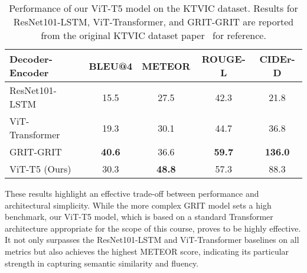 \begin{table}[H]
  \centering
  \renewcommand{\arraystretch}{1.5}
  \normalsize
  \label{tab:ktvic_comparison}
  \begin{tabular}{lcccc}
    \hline
    \textbf{Decoder-Encoder} & \textbf{BLEU@4} &
    \textbf{METEOR} & \textbf{ROUGE-L} & \textbf{CIDEr-D} \\
    \hline
    ResNet101-LSTM & 15.5 & 27.5 & 42.3 & 21.8   \\
    ViT-Transformer & 19.3 & 30.1 & 44.7 & 36.8    \\
    GRIT-GRIT & \textbf{40.6} & 36.6 & \textbf{59.7} & \textbf{136.0}    \\
    \hline
    ViT-T5 (Ours) & 30.3 & \textbf{48.8} & 57.3 & 88.3 \\
    \hline
  \end{tabular}
  \caption{Performance of our ViT-T5 model on the KTVIC dataset. Results for ResNet101-LSTM, ViT-Transformer, and GRIT-GRIT are reported from the original KTVIC dataset paper~\cite{pham2024ktvic} for reference.}
\end{table}

These results highlight an effective trade-off between performance and architectural simplicity. While the more complex GRIT model sets a high benchmark, our ViT-T5 model, which is based on a standard Transformer architecture appropriate for the scope of this course, proves to be highly effective. It not only surpasses the ResNet101-LSTM and ViT-Transformer baselines on all metrics but also achieves the highest METEOR score, indicating its particular strength in capturing semantic similarity and fluency.
